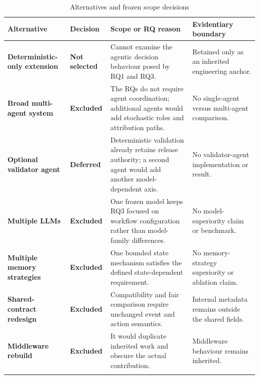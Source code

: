 \begin{table}[H]
\centering
\caption{Alternatives and frozen scope decisions}
\label{tab:design-alternatives}

\begingroup
\footnotesize
\setlength{\tabcolsep}{3pt}
\renewcommand{\arraystretch}{1.12}

\begin{tabularx}{\textwidth}{
  @{}
  L{0.18\textwidth}
  L{0.13\textwidth}
  L{0.31\textwidth}
  Y
  @{}
}
\toprule
\textbf{Alternative}
&
\textbf{Decision}
&
\textbf{Scope or RQ reason}
&
\textbf{Evidentiary boundary}
\\
\midrule

\textbf{Deterministic-only extension}
&
\textbf{Not selected}
&
Cannot examine the agentic decision behaviour posed by RQ1 and RQ3.
&
Retained only as an inherited engineering anchor.
\\
\addlinespace[1.5pt]

\textbf{Broad multi-agent system}
&
\textbf{Excluded}
&
The RQs do not require agent coordination; additional agents would add
stochastic roles and attribution paths.
&
No single-agent versus multi-agent comparison.
\\
\addlinespace[1.5pt]

\textbf{Optional validator agent}
&
\textbf{Deferred}
&
Deterministic validation already retains release authority; a second
agent would add another model-dependent axis.
&
No validator-agent implementation or result.
\\
\addlinespace[1.5pt]

\textbf{Multiple LLMs}
&
\textbf{Excluded}
&
One frozen model keeps RQ3 focused on workflow configuration rather than
model-family differences.
&
No model-superiority claim or benchmark.
\\
\addlinespace[1.5pt]

\textbf{Multiple memory strategies}
&
\textbf{Excluded}
&
One bounded state mechanism satisfies the defined state-dependent
requirement.
&
No memory-strategy superiority or ablation claim.
\\
\addlinespace[1.5pt]

\textbf{Shared-contract redesign}
&
\textbf{Excluded}
&
Compatibility and fair comparison require unchanged event and action
semantics.
&
Internal metadata remains outside the shared fields.
\\
\addlinespace[1.5pt]

\textbf{Middleware rebuild}
&
\textbf{Excluded}
&
It would duplicate inherited work and obscure the actual contribution.
&
Middleware behaviour remains inherited.
\\
\addlinespace[1.5pt]


\end{tabularx}
\end{table}
